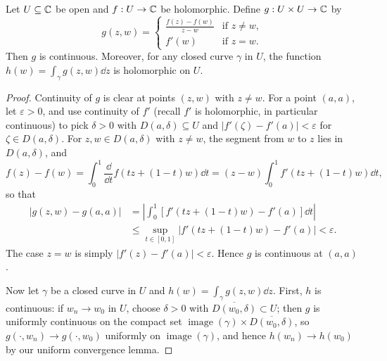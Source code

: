 \documentclass[a4paper]{scrartcl}
\begin{document}
\begin{lemma}
    Let $U \subseteq \mathbb{C}$ be open and $f: U \rightarrow \mathbb{C}$ be holomorphic. Define $g: U \times U \rightarrow \mathbb{C}$ by
    $$
    g(z, w) = \begin{cases}
        \frac{f(z) - f(w)}{z - w} &\mbox{if } z \neq w, \\
        f'(w) &\mbox{if } z = w.
       \end{cases}
    $$
    Then $g$ is continuous. Moreover, for any closed curve $\gamma$ in $U$, the function $h(w) = \int_\gamma g(z, w) \dd z$ is holomorphic on $U$.
\end{lemma}
\begin{proof}
    Continuity of $g$ is clear at points $(z, w)$ with $z \neq w$. For a point $(a, a)$, let $\varepsilon > 0$, and use continuity of $f'$ (recall $f'$ is holomorphic, in particular continuous) to pick $\delta > 0$ with $D(a, \delta) \subseteq U$ and $|f'(\zeta) - f'(a)| < \varepsilon$ for $\zeta \in D(a, \delta)$. For $z, w \in D(a, \delta)$ with $z \neq w$, the segment from $w$ to $z$ lies in $D(a, \delta)$, and
    $$
    f(z) - f(w) = \int_0^1 \frac{\dd}{\dd t} f(tz + (1 - t)w) \dd t = (z - w)\int_0^1 f'(tz + (1 - t)w) \dd t,
    $$
    so that
    \begin{align*}
    |g(z, w) - g(a, a)| &= \left|\int_0^1 \left[f'(tz + (1 - t)w) - f'(a)\right] \dd t \right| \\
    &\leq \sup_{t \in [0, 1]}|f'(tz + (1-t)w) - f'(a)| < \varepsilon.
    \end{align*}
    The case $z = w$ is simply $|f'(z) - f'(a)| < \varepsilon$. Hence $g$ is continuous at $(a, a)$.

    Now let $\gamma$ be a closed curve in $U$ and $h(w) = \int_\gamma g(z, w) \dd z$. First, $h$ is continuous: if $w_n \rightarrow w_0$ in $U$, choose $\delta > 0$ with $\overline{D(w_0, \delta)} \subset U$; then $g$ is uniformly continuous on the compact set $\operatorname{image}(\gamma) \times \overline{D(w_0, \delta)}$, so $g(\cdot, w_n) \rightarrow g(\cdot, w_0)$ uniformly on $\operatorname{image}(\gamma)$, and hence $h(w_n) \rightarrow h(w_0)$ by our uniform convergence lemma.


\end{proof}
\end{document}
